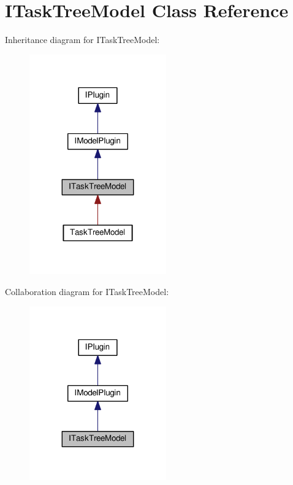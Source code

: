 \hypertarget{class_i_task_tree_model}{}\section{I\+Task\+Tree\+Model Class Reference}
\label{class_i_task_tree_model}


Inheritance diagram for I\+Task\+Tree\+Model\+:\nopagebreak
\begin{figure}[H]
\begin{center}
\leavevmode
\includegraphics[width=167pt]{class_i_task_tree_model__inherit__graph}
\end{center}
\end{figure}


Collaboration diagram for I\+Task\+Tree\+Model\+:\nopagebreak
\begin{figure}[H]
\begin{center}
\leavevmode
\includegraphics[width=167pt]{class_i_task_tree_model__coll__graph}
\end{center}
\end{figure}
